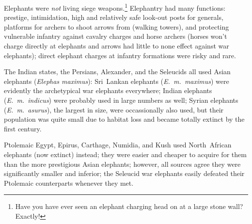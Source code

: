 \documentclass{article}
\begin{document}
Elephants were \emph{not} living siege weapons.\footnote{Have you have ever seen an elephant charging head on at a large stone wall? Exactly!} 
Elephantry had many functions: prestige, intimidation, high and relatively safe look-out posts for generals, platforms for archers to shoot arrows from (walking towers), and protecting vulnerable infantry against cavalry charges and horse archers (horses won't charge directly at elephants and arrows had little to none effect against war elephants); direct elephant charges at infantry formations were risky and rare.

The Indian states, the Persians, Alexander, and the Seleucids all used Asian elephants (\textit{Elephas maximus}): Sri~Lankan elephants (\textit{E.~m.~maximus}) were evidently the archetypical war elephants everywhere; Indian elephants (\textit{E.~m.~indicus}) were probably used in large numbers as well; Syrian elephants (\textit{E.~m.~asurus}), the largest in size, were occassionally also used, but their population was quite small due to habitat loss and became totally extinct by the first century.

Ptolemaic Egypt, Epirus, Carthage, Numidia, and Kush used North~African elephants (now extinct) instead; they were easier and cheaper to acquire for them than the more prestigious Asian elephants; however, all sources agree they were significantly smaller and inferior; the Seleucid war elephants easily defeated their Ptolemaic counterparts whenever they met.

\begin{comment}
\subsubsection{Siege weapons}
Siege crossbows, artillery, and quinqueremes were first invented in and used by Syracusae in the early fourth century B.C. (no coincidence) and from there spread quickly over the Mediterranean world; about a century later designs had stabilized and remained basically unchanged for centuries thereafter. Both dart and stone throwers were used not only in sieges, but also in pitched battles and in naval warfare; as far as there are any sources, a 6:1 dart thrower to stone thrower ratio seems to have been default usage.

The helepolis (siege tower) was first built and used by Demetrius besieging Rhodes (in 305 B.C.); it was characteristic of the megalomania of the Diadochoi: about $40\times 40\times 80$ metres in size, two heavy (180~lb) and four medium (60~lb) catapults in total on the lowest two floors, two light (30~lb) catapults on each of the next five floors, and two dart throwers on each of the top two floors. After the siege was abandoned, the Rhodians reportedly constructed the Colossus from the money raised from selling the siege engines.\footnote{\url{https://en.wikipedia.org/wiki/Helepolis}}
\end{comment}
\end{document}
